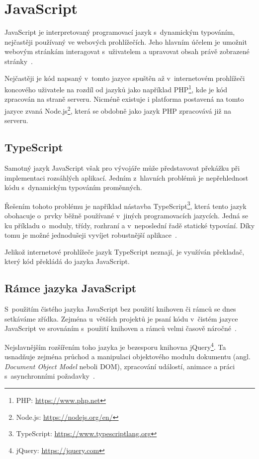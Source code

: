 \section{JavaScript}
JavaScript je interpretovaný programovací jazyk s~dynamickým typováním, nejčastěji používaný ve webových prohlížečích. Jeho hlavním účelem je umožnit webovým stránkám interagovat s~uživatelem a upravovat obsah právě zobrazené stránky~\cite{bib:js-definitive}.

Nejčastěji je kód napsaný v~tomto jazyce spuštěn až v~internetovém prohlížeči koncového uživatele na rozdíl od jazyků jako například PHP\footnote{PHP: \url{https://www.php.net}}, kde je kód zpracován na straně serveru. Nicméně existuje i platforma postavená na tomto jazyce zvaná Node.js\footnote{Node.js: \url{https://nodejs.org/en/}}, která se obdobně jako jazyk PHP zpracovává již na serveru.


\subsection{TypeScript}
Samotný jazyk JavaScript však pro vývojáře může představovat překážku při implementaci rozsáhlých aplikací. Jedním z~hlavních problémů je nepřehlednost kódu s~dynamickým typováním proměnných.

Řešením tohoto problému je například nástavba TypeScript\footnote{TypeScript: \url{https://www.typescriptlang.org}}, která tento jazyk obohacuje o~prvky běžně používané v~jiných programovacích jazycích. Jedná se ku příkladu o~moduly, třídy, rozhraní a v~neposlední řadě statické typování. Díky tomu je možné jednodušeji vyvíjet robustnější aplikace~\cite{bib:typescript}.
 
Jelikož internetové prohlížeče jazyk TypeScript neznají, je využíván překladač, který kód překládá do jazyka JavaScript.


\subsection{Rámce jazyka JavaScript}
S~použitím čistého jazyka JavaScript bez použití knihoven či rámců se dnes setkáváme zřídka. Zejména u~větších projektů je psaní kódu v~čistém jazyce JavaScript ve srovnáním s~použití knihoven a rámců velmi časově náročné~\cite{bib:vanilla-js}.

Nejslavnějším rozšířením toho jazyka je bezesporu knihovna jQuery\footnote{jQuery: \url{https://jquery.com}}. Ta usnadňuje zejména průchod a manipulaci objektového modulu dokumentu (angl. \emph{Document Object Model} neboli DOM), zpracování událostí, animace a práci s~asynchronními požadavky~\cite{bib:jquery}.

